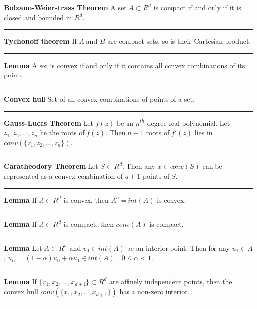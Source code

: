 \noindent
\textbf{Bolzano-Weierstrass Theorem} A set \(A \subset R^d\) 
is compact if and only if it is closed and bounded in \(R^d\).
\\
\rule{\linewidth}{0.1mm}

\noindent
\textbf{Tychonoff theorem} If \(A\) and \(B\) are compact sets, 
so is their Cartesian product.
\\
\rule{\linewidth}{0.1mm}

\noindent
\textbf{Lemma} A set is convex if and only if it contains all convex 
combinations of its points.
\\
\rule{\linewidth}{0.1mm}

\noindent
\textbf{Convex hull} Set of all convex combinations of points of a set.
\\
\rule{\linewidth}{0.1mm}

\noindent
\textbf{Gauss-Lucas Theorem} Let \(f(z)\) be an \(n^{th}\) degree real 
polynomial. Let \(z_1, z_2, \ldots, z_n\) be the roots of \(f(z)\). 
Then \(n-1\) roots of \(f'(z)\) lies in 
\(conv(\{z_1,z_2,\ldots,z_n\})\).
\\
\rule{\linewidth}{0.1mm}

\noindent
\textbf{Caratheodory Theorem} Let \(S \subset R^d\). Then any 
\(x \in conv(S)\) can be represented as a convex combination of \(d+1\) 
points of \(S\).
\\
\rule{\linewidth}{0.1mm}

\noindent
\textbf{Lemma} If \(A \subset R^d\) is convex, then \(A^o = int(A)\) is 
convex.
\\
\rule{\linewidth}{0.1mm}

\noindent
\textbf{Lemma} If \(A \subset R^d\) is compact, then \(conv(A)\) is 
compact.
\\
\rule{\linewidth}{0.1mm}

\noindent
\textbf{Lemma} Let \(A \subset R^n\) and \(u_0 \in int(A)\) be an 
interior point. Then for any \(u_1 \in A\),
\({u_\alpha = (1-\alpha)u_0 + \alpha u_1 \in int(A) 
\quad 0 \le \alpha < 1. }\)
\\
\rule{\linewidth}{0.1mm}


\noindent
\textbf{Lemma} If \(\{x_1,x_2,\ldots,x_{d+1}\} \subset R^d\) are affinely 
independent points, then the convex hull 
\(conv(\{x_1,x_2,\ldots,x_{d+1}\})\) has a 
non-zero interior.
\\
\rule{\linewidth}{0.1mm}

